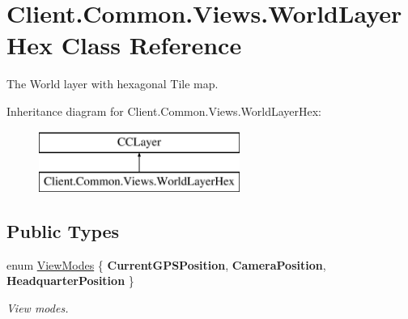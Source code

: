 \hypertarget{classClient_1_1Common_1_1Views_1_1WorldLayerHex}{}\section{Client.\+Common.\+Views.\+World\+Layer\+Hex Class Reference}
\label{classClient_1_1Common_1_1Views_1_1WorldLayerHex}


The World layer with hexagonal Tile map.  


Inheritance diagram for Client.\+Common.\+Views.\+World\+Layer\+Hex\+:\begin{figure}[H]
\begin{center}
\leavevmode
\includegraphics[height=2.000000cm]{classClient_1_1Common_1_1Views_1_1WorldLayerHex}
\end{center}
\end{figure}
\subsection*{Public Types}
\begin{DoxyCompactItemize}
\item 
enum \hyperlink{classClient_1_1Common_1_1Views_1_1WorldLayerHex_a40891eae0c33b440c8038472a5f64eb8}{View\+Modes} \{ {\bfseries Current\+G\+P\+S\+Position}, 
{\bfseries Camera\+Position}, 
{\bfseries Headquarter\+Position}
 \}\begin{DoxyCompactList}\small\item\em View modes. \end{DoxyCompactList}
\end{DoxyCompactItemize}
